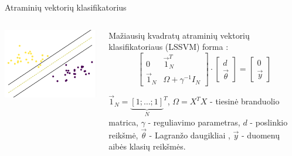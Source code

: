 \begin{frame}{Atraminių vektorių klasifikatorius}
    \begin{columns}
        \begin{column}{0.5\textwidth}
            \includegraphics[scale=0.45]{img/svm.png}
        \end{column}
    
        \begin{column}{0.4\textwidth}
        Mažiausių kvadratų atraminių vektorių klasifikatoriaus (LSSVM) forma \cite{LSSVM}:
            \begin{equation}
                \begin{bmatrix}
                    0 & \vec{1}_N^T \\
                    \vec{1}_N & \Omega + \gamma^{-1} I_N
                \end{bmatrix} \cdot 
                \begin{bmatrix}
                    d \\
                    \vec{\theta}
                \end{bmatrix} = 
                \begin{bmatrix}
                    0 \\
                    \vec{y}    
                \end{bmatrix} \nonumber
            \end{equation}
            
            $\vec{1}_N = {\underbrace{[1;\ldots; 1]}_{N}}^T$, $\Omega = X^T X$ - tiesinė branduolio matrica, $\gamma$ - reguliavimo parametras, $d$ - poslinkio reikšmė, $\vec{\theta}$ - Lagranžo daugikliai , $\vec{y}$ - duomenų aibės klasių reikšmės.
        \end{column}
    \end{columns}
\end{frame}